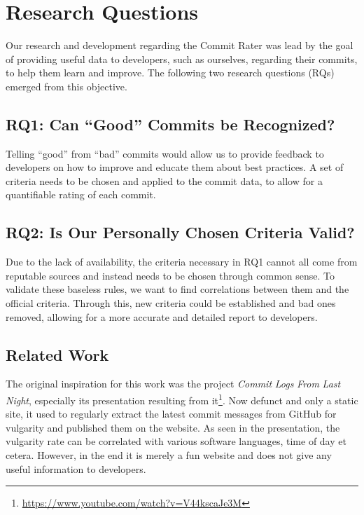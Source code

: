 \section{Research Questions}
\label{sec:research-questions}

Our research and development regarding the Commit Rater was lead by the goal of providing useful data to developers, such as ourselves, regarding their commits, to help them learn and improve. The following two research questions (RQs) emerged from this objective.


\subsection{RQ1: Can ``Good'' Commits be Recognized?}
\label{sec:rq1}

Telling ``good'' from ``bad'' commits would allow us to provide feedback to developers on how to improve and educate them about best practices. A set of criteria needs to be chosen and applied to the commit data, to allow for a quantifiable rating of each commit.


\subsection{RQ2: Is Our Personally Chosen Criteria Valid?}
\label{sec:rq2}

Due to the lack of availability, the criteria necessary in RQ1 cannot all come from reputable sources and instead needs to be chosen through common sense. To validate these baseless rules, we want to find correlations between them and the official criteria. Through this, new criteria could be established and bad ones removed, allowing for a more accurate and detailed report to developers.


\subsection{Related Work}
\label{sec:related-work}

The original inspiration for this work was the project \emph{Commit} \emph{Logs} \emph{From} \emph{Last} \emph{Night}\cite{LastNight}, especially its presentation resulting from it\footnote{\url{https://www.youtube.com/watch?v=V44kscaJe3M}}. Now defunct and only a static site, it used to regularly extract the latest commit messages from GitHub for vulgarity and published them on the website. As seen in the presentation, the vulgarity rate can be correlated with various software languages, time of day et cetera. However, in the end it is merely a fun website and does not give any useful information to developers.

